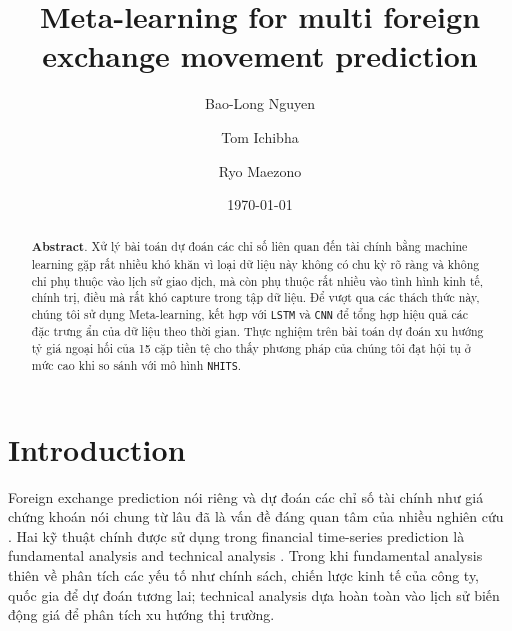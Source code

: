 \documentclass[aps,prb,groupedaddress,twocolumn,showpacs,dvipdfmx, superscriptaddress,pdftex]{revtex4-2}
\begin{document}
\title{
  Meta-learning for multi foreign exchange movement prediction
}
\author{Bao-Long Nguyen}
%
\author{Tom Ichibha}
%
\author{Ryo Maezono}
%
\date{\today}
\begin{abstract}

  \textbf{Abstract}. Xử lý bài toán dự đoán các chỉ số liên quan đến tài chính bằng machine learning gặp rất nhiều khó khăn vì loại dữ liệu này không có chu kỳ rõ ràng và không chỉ phụ thuộc vào lịch sử giao dịch, mà còn phụ thuộc rất nhiều vào tình hình kinh tế, chính trị, điều mà rất khó capture trong tập dữ liệu. Để vượt qua các thách thức này, chúng tôi sử dụng Meta-learning, kết hợp với \verb|LSTM| và \verb|CNN| để tổng hợp hiệu quả các đặc trưng ẩn của dữ liệu theo thời gian. Thực nghiệm trên bài toán dự đoán xu hướng tỷ giá ngoại hối của 15 cặp tiền tệ cho thấy phương pháp của chúng tôi đạt hội tụ ở mức cao khi so sánh với mô hình \verb|NHITS|. %

\end{abstract}
\maketitle

\section{Introduction}

Foreign exchange prediction nói riêng và dự đoán các chỉ số tài chính như giá chứng khoán nói chung từ lâu đã là vấn đề đáng quan tâm của nhiều nghiên cứu \citep{li2019multi, islam2021foreign, heryadi2021foreign}. Hai kỹ thuật chính được sử dụng trong financial time-series prediction là fundamental analysis and technical analysis \cite{ayitey2023forex}. Trong khi fundamental analysis thiên về phân tích các yếu tố như chính sách, chiến lược kinh tế của công ty, quốc gia để dự đoán tương lai; technical analysis dựa hoàn toàn vào lịch sử biến động giá để phân tích xu hướng thị trường.
\end{document}
